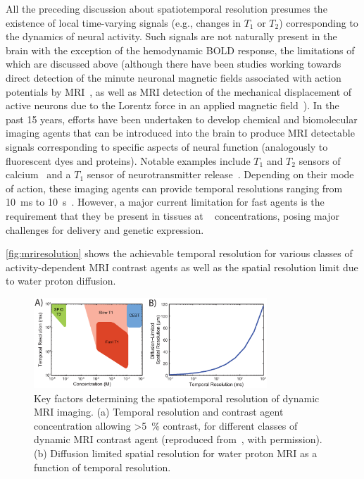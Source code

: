 All the preceding discussion about spatiotemporal resolution presumes the existence of local time-varying signals (e.g., changes in $T_1$ or $T_2$) corresponding to the dynamics of neural activity.
Such signals are not naturally present in the brain with the exception of the hemodynamic BOLD response, the limitations of which are discussed above (although there have been studies working towards direct detection of the minute neuronal magnetic fields associated with action potentials by MRI~\cite{Bodurka2002}, as well as MRI detection of the mechanical displacement of active neurons due to the Lorentz force in an applied magnetic field~\cite{roth2009mechanical}).
In the past 15 years, efforts have been undertaken to develop chemical and biomolecular imaging agents that can be introduced into the brain to produce MRI detectable signals corresponding to specific aspects of neural function (analogously to fluorescent dyes and proteins).
Notable examples include $T_1$ and $T_2$ sensors of calcium~\cite{atanasijevic06,li99} and a $T_1$ sensor of neurotransmitter release~\cite{shapiro10}.
Depending on their mode of action, these imaging agents can provide temporal resolutions ranging from \SI{10}{\milli\second} to \SI{10}{\second}~\cite{shapiro06}.
However, a major current limitation for fast agents is the requirement that they be present in tissues at \si{\micro\Molar} concentrations, posing major challenges for delivery and genetic expression.

\autoref{fig:mriresolution} shows the achievable temporal resolution for various classes of activity-dependent MRI contrast agents as well as the spatial resolution limit due to water proton diffusion.

\begin{figure}[htbp]
\caption{Key factors determining the spatiotemporal resolution of dynamic MRI imaging. (a) Temporal resolution and contrast agent concentration allowing \SI{>5}{\percent} contrast, for different classes of dynamic MRI contrast agent (reproduced from~\cite{shapiro06}, with permission). (b) Diffusion limited spatial resolution for water proton MRI as a function of temporal resolution.}
\label{fig:mriresolution}
\centering
\includegraphics[width=0.78\textwidth]{figs/Fig6.eps}
\end{figure}

